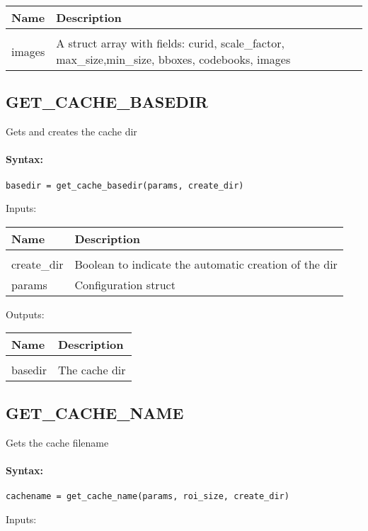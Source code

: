 \begin{tabular}{|l|p{5cm}|}
\hline
\textbf{Name} & \textbf{Description} \\
\hline \hline \\
images & A struct array with fields: curid, scale\_factor, max\_size,min\_size, bboxes, codebooks, images  \\ \hline
\end{tabular}

\subsection{GET\_CACHE\_BASEDIR}

Gets and creates the cache dir

\paragraph{Syntax:} \verb|basedir = get_cache_basedir(params, create_dir)|

Inputs:

\begin{tabular}{|l|p{5cm}|}
\hline
\textbf{Name} & \textbf{Description} \\
\hline \hline \\
create\_dir & Boolean to indicate the automatic creation of the dir  \\ \hline
params & Configuration struct  \\ \hline
\end{tabular}
Outputs:

\begin{tabular}{|l|p{5cm}|}
\hline
\textbf{Name} & \textbf{Description} \\
\hline \hline \\
basedir & The cache dir  \\ \hline
\end{tabular}

\subsection{GET\_CACHE\_NAME}

Gets the cache filename

\paragraph{Syntax:} \verb|cachename = get_cache_name(params, roi_size, create_dir)|

Inputs:

